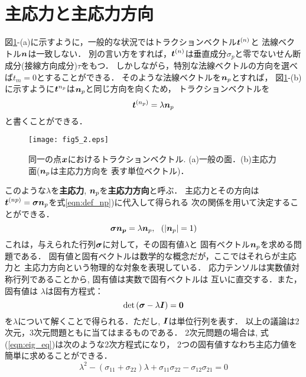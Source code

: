 \documentclass[10pt,a4j]{jbook}
\begin{document}
\section{主応力と主応力方向}
図\ref{fig:fig5_2}-(a)に示すように，一般的な状況ではトラクションベクトル$\mbox{\boldmath $t$}^{(n)}$と
法線ベクトル$\mbox{\boldmath $n$}$は一致しない．
別の言い方をすれば，$\mbox{\boldmath $t$}^{(n)}$は垂直成分$\sigma_p$と零でないせん断成分(接線方向成分)$\tau$をもつ．
しかしながら，特別な法線ベクトルの方向を選べば$t_m=0$とすることができる．
そのような法線ベクトルを$\mbox{\boldmath $n$}_p$とすれば，
図\ref{fig:fig5_2}-(b)に示すように$\mbox{\boldmath $t$}^{n_p}$は$\mbox{\boldmath $n$}_p$と同じ方向を向くため，
トラクションベクトルを
\begin{equation}
	\mbox{\boldmath $t$}^{(n_p)}=\lambda \mbox{\boldmath $n$}_p
	\label{eqn:def_np}
\end{equation}
と書くことができる．
\begin{figure}[h]
	\begin{center}
	\texttt{[image: fig5\_2.eps]} 
	\end{center}
	\caption{
	同一の点$\mbox{\boldmath $x$}$におけるトラクションベクトル. (a)一般の面．(b)主応力面($\mbox{\boldmath $n$}_p$は主応力方向を
	表す単位ベクトル)．} 
	\label{fig:fig5_2}
\end{figure}
このような$\lambda$を{\bf 主応力}, $\mbox{\boldmath $n$}_p$を{\bf 主応力方向}と呼ぶ．
主応力とその方向は$\mbox{\boldmath $t$}^{(np)}=\mbox{\boldmath $\sigma$}\mbox{\boldmath $n$}_p$を式\ref{eqn:def_np})に代入して得られる
次の関係を用いて決定することができる．
\begin{equation}
	\mbox{\boldmath $\sigma$}\mbox{\boldmath $n_p$} 
	=\lambda \mbox{\boldmath $n$}_p, \ \ (|\mbox{\boldmath $n$}_p|=1)
	\label{eqn:eig_prb}
\end{equation}
これは，与えられた行列$\mbox{\boldmath $\sigma$}$に対して，その固有値$\lambda$と
固有ベクトル$\mbox{\boldmath $n$}_p$を求める問題である．
固有値と固有ベクトルは数学的な概念だが，ここではそれらが主応力と
主応力方向という物理的な対象を表現している．
応力テンソルは実数値対称行列であることから, 固有値は実数で固有ベクトルは
互いに直交する．また，固有値は
$\lambda$は固有方程式：
\begin{equation}
	{\rm det} \left( \mbox{\boldmath $\sigma$}- \lambda \mbox{\boldmath $I$} \right) =\mbox{\boldmath $0$} 
	\label{eqn:eig_eq}
\end{equation}
を$\lambda$について解くことで得られる．ただし, $\mbox{\boldmath $I$}$は単位行列を表す．
以上の議論は2次元，3次元問題ともに当てはまるものである．
2次元問題の場合は, 式(\ref{eqn:eig_eq})は次のような2次方程式になり，
2つの固有値すなわち主応力値を簡単に求めることができる．
\begin{equation}
	\lambda^2 -\left( \sigma_{11}+\sigma_{22}\right)\lambda + 
	\sigma_{11}\sigma_{22}-\sigma_{12}\sigma_{21}=0
	\label{eqn:eig_eq_2d}
\end{equation}
\end{document}
